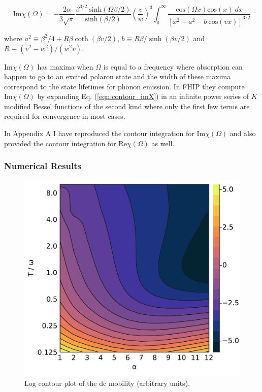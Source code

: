 \begin{equation}\label{eqn:contour_imX}
    \textrm{Im}\chi(\Omega) = - \frac{2 \alpha}{3 \sqrt{\pi}} \frac{\beta^{3/2}\ \textrm{sinh}(\Omega \beta / 2)}{\textrm{sinh}(\beta / 2)} \left( \frac{v}{w} \right)^3 \int_0^\infty \frac{\textrm{cos}(\Omega x) \textrm{cos}(x)\ dx}{\left[x^2 + a^2 - b\ \textrm{cos}(vx) \right]^{3/2}}
\end{equation}

where $a^2 \equiv \beta^2 / 4 + R \beta \coth (\beta v / 2)$, $b \equiv R\beta / \sinh(\beta v / 2)$ and $R \equiv (v^2 - w^2) / (w^2 v)$. 

$\text{Im} \chi(\Omega)$ has maxima when $\Omega$ is equal to a frequency where absorption can happen to go to an excited polaron state and the width of these maxima correspond to the state lifetimes for phonon emission. In FHIP they compute $\text{Im}\chi(\Omega)$ by expanding Eq. (\ref{eqn:contour_imX}) in an infinite power series of $K$ modified Bessel functions of the second kind where only the first few terms are required for convergence in most cases.  

In Appendix A I have reproduced the contour integration for $\text{Im}\chi(\Omega)$ and also provided the contour integration for $\text{Re}\chi(\Omega)$ as well.

\subsubsection{Numerical Results}

\begin{figure}[t]
    \centering
    \includegraphics[width=.7\textwidth]{figures/dc_mobility.pdf}
    \caption{Log contour plot of the dc mobility (arbitrary units).}
    \label{fig:dcmobility}
\end{figure}

